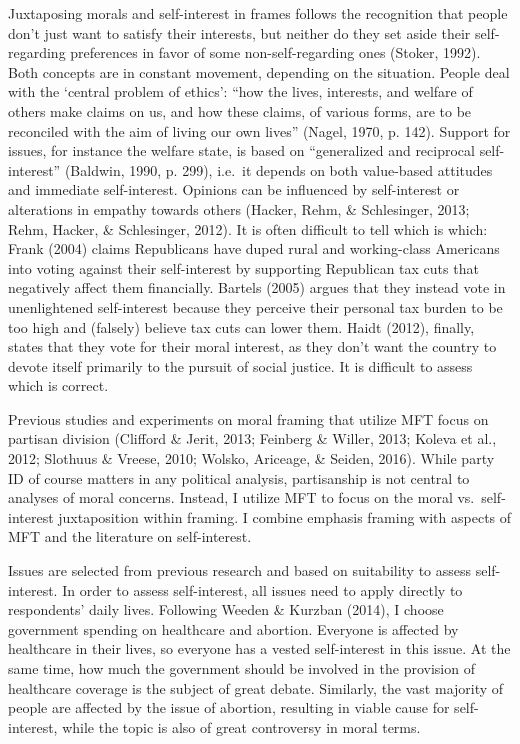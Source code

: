 \documentclass[12pt,econ]{sources/authesis}
\begin{document}
Juxtaposing morals and self-interest in frames follows the recognition that people don't just want to satisfy their interests, but neither do they set aside their self-regarding preferences in favor of some non-self-regarding ones (Stoker, 1992). Both concepts are in constant movement, depending on the situation. People deal with the `central problem of ethics': ``how the lives, interests, and welfare of others make claims on us, and how these claims, of various forms, are to be reconciled with the aim of living our own lives'' (Nagel, 1970, p. 142). Support for issues, for instance the welfare state, is based on ``generalized and reciprocal self-interest'' (Baldwin, 1990, p. 299), i.e.~it depends on both value-based attitudes and immediate self-interest. Opinions can be influenced by self-interest or alterations in empathy towards others (Hacker, Rehm, \& Schlesinger, 2013; Rehm, Hacker, \& Schlesinger, 2012). It is often difficult to tell which is which: Frank (2004) claims Republicans have duped rural and working-class Americans into voting against their self-interest by supporting Republican tax cuts that negatively affect them financially. Bartels (2005) argues that they instead vote in unenlightened self-interest because they perceive their personal tax burden to be too high and (falsely) believe tax cuts can lower them. Haidt (2012), finally, states that they vote for their moral interest, as they don't want the country to devote itself primarily to the pursuit of social justice. It is difficult to assess which is correct.

Previous studies and experiments on moral framing that utilize MFT focus on partisan division (Clifford \& Jerit, 2013; Feinberg \& Willer, 2013; Koleva et al., 2012; Slothuus \& Vreese, 2010; Wolsko, Ariceage, \& Seiden, 2016). While party ID of course matters in any political analysis, partisanship is not central to analyses of moral concerns. Instead, I utilize MFT to focus on the moral vs.~self-interest juxtaposition within framing. I combine emphasis framing with aspects of MFT and the literature on self-interest.

Issues are selected from previous research and based on suitability to assess self-interest. In order to assess self-interest, all issues need to apply directly to respondents' daily lives. Following Weeden \& Kurzban (2014), I choose government spending on healthcare and abortion. Everyone is affected by healthcare in their lives, so everyone has a vested self-interest in this issue. At the same time, how much the government should be involved in the provision of healthcare coverage is the subject of great debate. Similarly, the vast majority of people are affected by the issue of abortion, resulting in viable cause for self-interest, while the topic is also of great controversy in moral terms.
\end{document}
